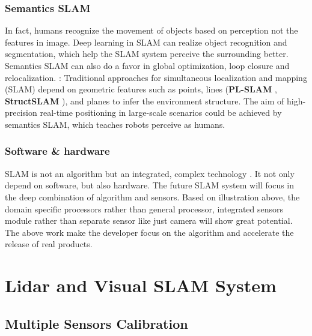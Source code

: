 \documentclass[journal,transmag]{IEEEtran}
\begin{document}
\subsubsection{Semantics SLAM}
In fact, humans recognize the movement of objects based on perception not the features in image.  Deep learning in SLAM can realize object recognition and segmentation, which help the SLAM system perceive the surrounding better. Semantics SLAM can also do a favor in global optimization, loop closure and relocalization. \cite{atanasov2018unifying}: Traditional approaches for simultaneous localization and mapping (SLAM) depend on geometric features such as points, lines (\textbf{PL-SLAM} \cite{gomez2019pl}, \textbf{StructSLAM} \cite{zhou2015structslam} ), and planes to infer the environment structure. The aim of high-precision real-time positioning in large-scale scenarios could be achieved by semantics SLAM, which teaches robots perceive as humans. 
\subsubsection{Software \& hardware}
SLAM is not an algorithm but an integrated, complex technology \cite{riisgaard2005dummies}. It not only depend on software, but also hardware. The future SLAM system will focus in the deep combination of algorithm and sensors. Based on illustration above, the domain specific processors rather than general processor, integrated sensors module rather than separate sensor like just camera will show great potential. The above work make the developer focus on the algorithm and accelerate the release of real products.

\section{Lidar and Visual SLAM System}
\subsection{Multiple Sensors Calibration}
\end{document}
